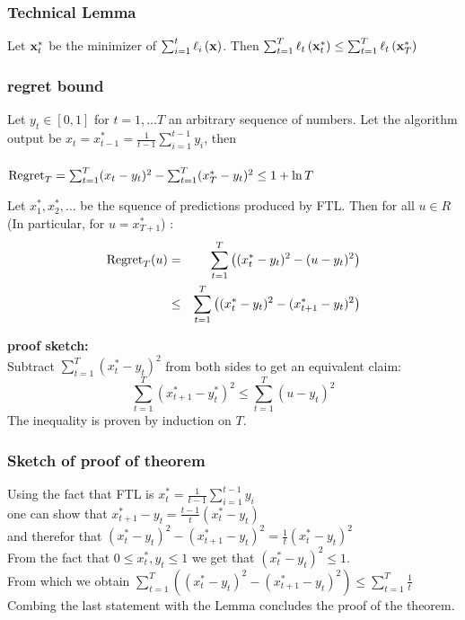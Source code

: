 \documentclass[handout]{beamer}
\begin{document}
\begin{frame}
\frametitle{Technical Lemma}
\begin{lemma}
  Let $\vx_t^*$ be the minimizer of $\sum_{i=1}^t \elloss{\vx}{i}$. Then
$  \sum_{t=1}^T \elloss{\vx_t^*}{t} \leq \sum_{t=1}^T \elloss{\vx_T^*}{t}$
  \end{lemma}
\end{frame}
\fi
\begin{frame}
\frametitle{regret bound}
\begin{theorem}
Let $y_t \in [0,1]$ for $t=1,\ldots T$ an arbitrary sequence of
numbers. Let the algorithm output be
$ x_t = x_{t-1}^* = \frac{1}{t-1} \sum_{i=1}^{t-1} y_i$, then\\
~\\
$ \regret_T = \sum_{t=1}^T (x_t-y_t)^2 - \sum_{t=1}^T (x^*_T-y_t)^2
\leq 1 + \ln T$
\end{theorem}
\end{frame}

\begin{tiny}
\begin{frame}
  \begin{lemma}
    Let $x_1^*, x_2^*,\ldots$ be the squence of predictions produced by FTL. Then for all $u \in R$ (In particular, for $u=x_{T+1}^*$) :
    \begin{eqnarray*}
      \regret_T(u) &=& \sum_{t=1}^T \left( (x_t^*-y_t)^2 - (u - y_t)^2\right)\\
      &\leq& \sum_{t=1}^T \left( (x_t^*-y_t)^2 - (x^*_{t+1}- y_t)^2\right)
    \end{eqnarray*}
  \end{lemma}
  {\bf proof sketch:}\\
  Subtract $\sum_{t=1}^T (x_t^*-y_t)^2$ from both sides to get an equivalent claim:
  \[
    \sum_{t=1}^T (x^*_{t+1}- y_t^*)^2 \leq \sum_{t=1}^T (u - y_t)^2
  \]
The inequality is proven by induction on $T$.
\end{frame}

\begin{frame}
\frametitle{Sketch of proof of theorem}
Using the fact that FTL is $x^*_t = \frac{1}{t-1} \sum_{i=1}^{t-1} y_i$ \\
one can show that $x_{t+1}^*-y_t = \frac{t-1}{t} (x_t^* - y_t)$\\
and therefor that $(x_t^*-y_t)^2 - (x_{t+1}^*-y_t)^2 = \frac{1}{t} (x_t^* - y_t)^2$\\
From the fact that $0\leq x_t^*,y_t \leq 1$ we get that $(x_t^*-y_t)^2\leq 1$.\\
From which we obtain $\sum_{t=1}^T ((x_t^* - y_t)^2-(x_{t+1}^* - y_t)^2) \leq
\sum_{t=1}^{T} \frac{1}{t}$\\
Combing the last statement with the Lemma concludes the proof of the theorem.

\end{frame}
\end{tiny}
\end{document}
